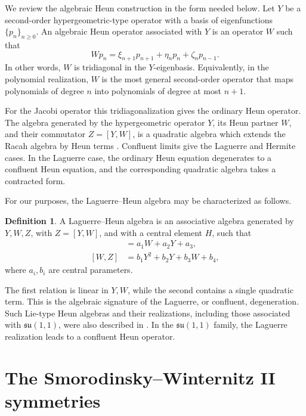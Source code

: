 \documentclass[11pt]{article}
\numberwithin{equation}{section}
\theoremstyle{definition}
\newtheorem{definition}[theorem]{Definition}
\theoremstyle{remark}
\begin{document}
We review the algebraic Heun construction in the form needed below.  Let
\(Y\) be a second-order hypergeometric-type operator with a basis of
eigenfunctions \(\{p_n\}_{n\geq0}\).  An algebraic Heun operator associated
with \(Y\) is an operator \(W\) such that
\begin{equation}
  Wp_n=\xi_{n+1}p_{n+1}+\eta_n p_n+\zeta_n p_{n-1}.
  \label{eq:tri-action}
\end{equation}
In other words, \(W\) is tridiagonal in the \(Y\)-eigenbasis.  Equivalently,
in the polynomial realization, \(W\) is the most general second-order
operator that maps polynomials of degree \(n\) into polynomials of degree at
most \(n+1\).

For the Jacobi operator this tridiagonalization gives the ordinary Heun
operator.  The algebra generated by the hypergeometric operator \(Y\), its
Heun partner \(W\), and their commutator \(Z=[Y,W]\), is a quadratic algebra
which extends the Racah algebra by Heun terms \cite{GVZ2017}.  Confluent
limits give the Laguerre and Hermite cases.  In the Laguerre case, the
ordinary Heun equation degenerates to a confluent Heun equation, and the
corresponding quadratic algebra takes a contracted form.

For our purposes, the Laguerre--Heun algebra may be characterized as follows.

\begin{definition}
A Laguerre--Heun algebra is an associative algebra generated by \(Y,W,Z\),
with \(Z=[Y,W]\), and with a central element \(H\), such that
\begin{align}
 [Y,Z]&=a_1W+a_2Y+a_3,                                      \label{eq:LH1}\\
 [W,Z]&=b_1Y^2+b_2Y+b_3W+b_4,                               \label{eq:LH2}
\end{align}
where \(a_i,b_i\) are central parameters.
\end{definition}

The first relation is linear in \(Y,W\), while the second contains a single
quadratic term.  This is the algebraic signature of the Laguerre, or
confluent, degeneration.  Such Lie-type Heun algebras and their
realizations, including those associated with \(\mathfrak{su}(1,1)\), were
also described in \cite{CrampeVinetZhedanov2020}.  In the
\(\mathfrak{su}(1,1)\) family, the Laguerre realization leads to a confluent
Heun operator.

\section{The Smorodinsky--Winternitz II symmetries}
\end{document}

